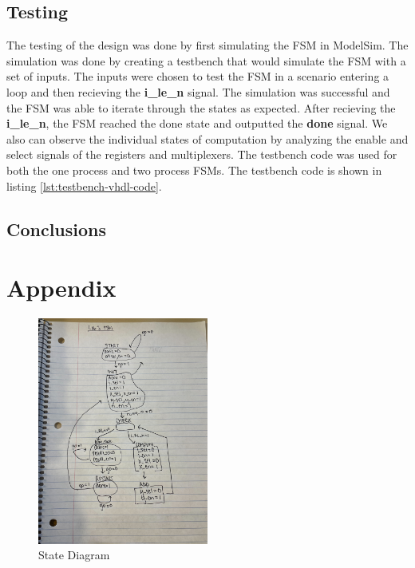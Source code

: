 \documentclass{article}
\begin{document}
\subsection*{Testing}
The testing of the design was done by first simulating the FSM in ModelSim. The simulation was done by creating a testbench that would simulate the FSM with a set of inputs. The inputs were chosen to test the FSM in a scenario entering a loop and then recieving the \textbf{i\_le\_n} signal. The simulation was successful and the FSM was able to iterate through the states as expected. After recieving the \textbf{i\_le\_n}, the FSM reached the done state and outputted the \textbf{done} signal. We also can observe the individual states of computation by analyzing the enable and select signals of the registers and multiplexers. The testbench code was used for both the one process and two process FSMs. The testbench code is shown in listing \ref{lst:testbench-vhdl-code}. 

\subsection*{Conclusions}

\section*{Appendix}

\begin{figure}[H]
  \centering
  \includegraphics[width=0.5\textwidth]{state_diagram.jpg}
  \caption{State Diagram}
  \label{fig:state-diagram}
\end{figure}
\end{document}
